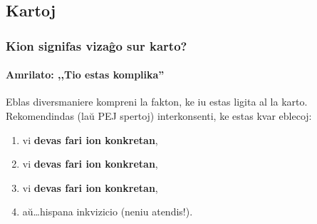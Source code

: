 \subsection{Kartoj}
  \begin{frame}
    \frametitle{Kion signifas vizaĝo sur karto?}
    \framesubtitle{Amrilato: ,,Tio estas komplika''}
	
	Eblas diversmaniere kompreni la fakton, ke iu estas ligita al la karto. Rekomendindas (laŭ PEJ spertoj) interkonsenti, ke estas kvar eblecoj:
	\begin{enumerate}
		\item vi \textbf{devas fari ion konkretan},
		\item vi \textbf{devas fari ion konkretan},
		\item vi \textbf{devas fari ion konkretan},
		\pause
		\item aŭ\dots \pause hispana inkvizicio \alert{(neniu atendis!)}.
	\end{enumerate}

  \end{frame}


